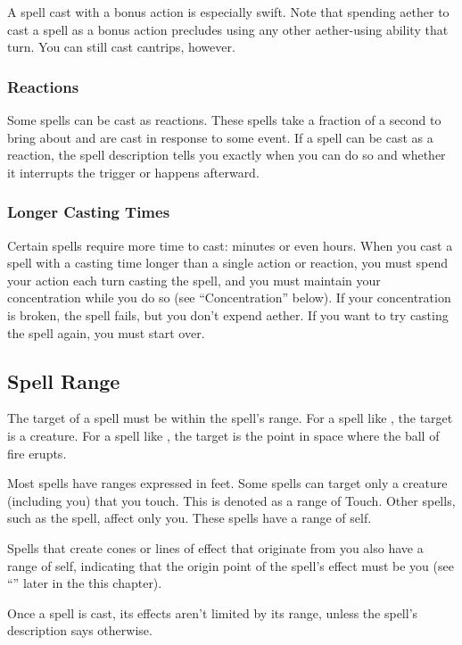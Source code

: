 A spell cast with a bonus action is especially swift. Note that spending aether to cast a spell as a bonus action precludes using any other aether-using ability that turn. You can still cast cantrips, however.

\subsubsection{Reactions}

Some spells can be cast as reactions. These spells take a fraction of a second to bring about and are cast in response to some event. If a spell can be cast as a reaction, the spell description tells you exactly when you can do so and whether it interrupts the trigger or happens afterward.

\subsubsection{Longer Casting Times}

Certain spells require more time to cast: minutes or even hours. When you cast a spell with a casting time longer than a single action or reaction, you must spend your action each turn casting the spell, and you must maintain your concentration while you do so (see “Concentration” below). If your concentration is broken, the spell fails, but you don't expend aether. If you want to try casting the spell again, you must start over.

\subsection{Spell Range}

The target of a spell must be within the spell's range. For a spell like , the target is a creature. For a spell like , the target is the point in space where the ball of fire erupts.

Most spells have ranges expressed in feet. Some spells can target only a creature (including you) that you touch. This is denoted as a range of Touch. Other spells, such as the  spell, affect only you. These spells have a range of self.

Spells that create cones or lines of effect that originate from you also have a range of self, indicating that the origin point of the spell's effect must be you (see “” later in the this chapter).

Once a spell is cast, its effects aren't limited by its range, unless the spell's description says otherwise.

